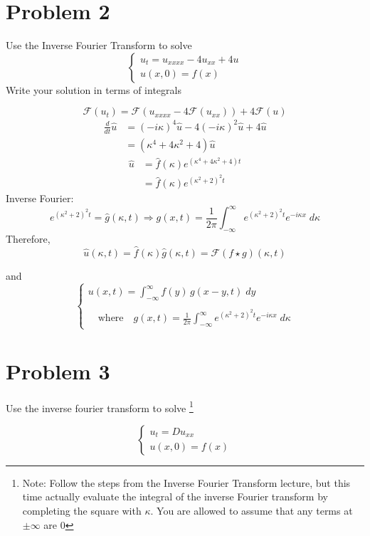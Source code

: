 \documentclass[12pt]{article}
\renewcommand{\hat}[1]{\widehat{#1}}
\newcommand{\F}[1]{\mathcal{F}(#1)}
\begin{document}
\color{black}
\pagebreak
\section*{Problem 2}
Use the Inverse Fourier Transform to solve 
\[\begin{cases}
    u_t = u_{xxxx} - 4u_{xx} + 4u\\
    u(x, 0) = f(x)
\end{cases}\]
Write your solution in terms of integrals

\color{blue}
\[\F{u_t} = \F{u_{xxxx} - 4\F{u_{xx}}} + 4\F{u}\]
\begin{align*}
    \frac{d}{dt} \hat{u} &= (-i\kappa)^4 \hat{u} - 4(-i\kappa)^2 \hat{u} + 4\hat{u}\\
    &= (\kappa^4 + 4\kappa^2 + 4)\hat{u}
\end{align*}
\begin{align*}
    \hat{u} &= \hat{f}(\kappa)e^{(\kappa^4 + 4\kappa^2 + 4)t}\\
    &= \hat{f}(\kappa)e^{(\kappa^2 + 2)^2t} 
\end{align*}
Inverse Fourier:
\[e^{(\kappa^2 + 2)^2t} = \hat{g}(\kappa, t) \Longrightarrow g(x, t) = \frac{1}{2\pi} \int_{-\infty}^{\infty} e^{(\kappa^2 + 2)^2t} e^{-i\kappa x}\; d\kappa\]
Therefore, 
\[\hat{u}(\kappa, t) = \hat{f}(\kappa) \hat{g}(\kappa, t) = \F{f \star g}(\kappa, t)\]

and 
\[\boxed{\begin{cases}
    u(x, t) = \int_{-\infty}^\infty f(y) \, g(x- y, t)\; dy\\
    \\
    \quad \text{where} \quad g(x, t) = \frac{1}{2\pi} \int_{-\infty}^{\infty} e^{(\kappa^2 + 2)^2t} e^{-i\kappa x}\; d\kappa
\end{cases}}\]
\color{black}
\pagebreak
\section*{Problem 3}
Use the inverse fourier transform to solve
\footnote{Note: Follow the steps from the Inverse Fourier Transform lecture, but this time actually evaluate the integral of the inverse
Fourier transform by completing the square with $\kappa$. You are allowed to assume that any terms at $\pm \infty$ are 0}

\[\begin{cases}
    u_t = Du_{xx}\\
    u(x, 0) = f(x)
\end{cases}\]
\end{document}
